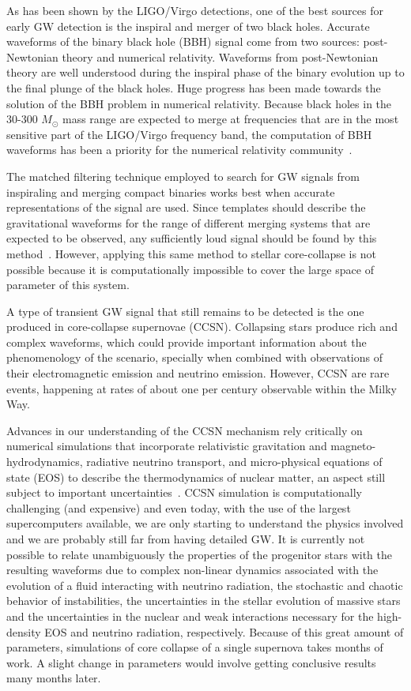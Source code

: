 \documentclass[fleqn,usenatbib]{mnras}
\begin{document}
As has been shown by the LIGO/Virgo detections, one of the best sources for early GW detection is the inspiral and merger of two black holes. Accurate waveforms of the binary black hole (BBH)  signal come from two sources: post-Newtonian theory and numerical relativity. Waveforms from post-Newtonian theory are well understood during the inspiral phase of the binary evolution up to the final plunge of the black holes. Huge progress has been made towards the solution of the BBH problem in numerical relativity. Because black holes in the 30-300 $M_\odot$ mass range are expected to merge at frequencies that are in the most sensitive part of the LIGO/Virgo frequency band, the computation of BBH waveforms has been a priority for the numerical relativity community~\cite{}.
 
The matched filtering technique employed to search for GW signals from inspiraling and merging compact binaries works best when accurate representations of the signal are used. Since templates should describe the gravitational waveforms for the range of different merging systems that are expected to be observed, any sufficiently loud signal should be found by this method~\cite{}. However, applying this same method to stellar core-collapse is not possible because it is computationally impossible to cover the large space of parameter of this system.


A type of transient GW signal that still remains to be detected is the one produced in core-collapse supernovae (CCSN). Collapsing stars produce rich and complex waveforms, which could provide important information about the phenomenology of the scenario, specially when combined with observations of their electromagnetic emission and neutrino emission. However, CCSN are rare events, happening at rates of about one per century observable within the Milky Way.

Advances in our understanding of the CCSN mechanism rely critically on numerical simulations that incorporate relativistic gravitation and magneto-hydrodynamics, radiative neutrino transport, and micro-physical equations of state (EOS) to describe the thermodynamics of nuclear matter, an aspect still subject to important uncertainties~\cite{}. CCSN simulation is computationally challenging (and expensive) and even today, with the use of the largest supercomputers available, we are only starting to understand the physics involved and we are probably still far from having detailed GW. It is currently not possible to relate unambiguously the properties of the progenitor stars with the resulting waveforms due to complex non-linear dynamics associated with the evolution of a fluid interacting with neutrino radiation, the stochastic and chaotic behavior of instabilities, the uncertainties in the stellar evolution of massive stars and the uncertainties in the nuclear and weak interactions necessary for the high-density EOS and neutrino radiation, respectively. Because of this great amount of parameters,  simulations of core collapse of a single supernova takes months of work. A slight change in parameters would involve getting conclusive results many months later.
\end{document}
